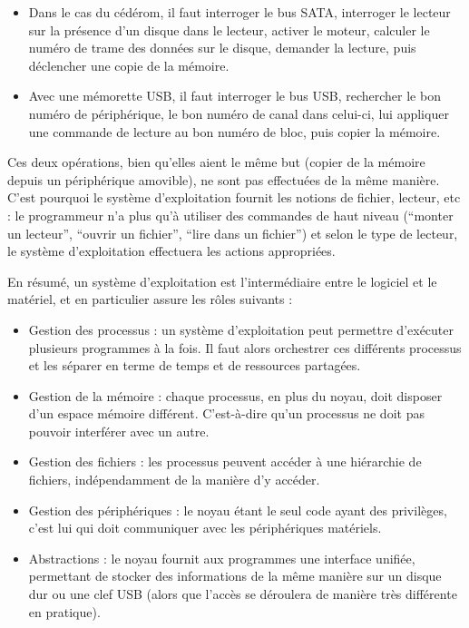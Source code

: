 \begin{itemize}

  \item Dans le cas du cédérom, il faut interroger le bus SATA, interroger le
    lecteur sur la présence d'un disque dans le lecteur, activer le moteur,
    calculer le numéro de trame des données sur le disque, demander la lecture,
    puis déclencher une
    copie de la mémoire.

  \item Avec une mémorette USB, il faut interroger le bus USB, rechercher le bon
    numéro de périphérique, le bon numéro de canal dans celui-ci, lui appliquer
    une commande de lecture au bon numéro de bloc, puis copier la mémoire.

\end{itemize}

Ces deux opérations, bien qu'elles aient le même but (copier de la mémoire
depuis un périphérique amovible), ne sont pas effectuées de la même manière.
C'est pourquoi le système d'exploitation fournit les notions de fichier,
lecteur, etc : le programmeur n'a plus qu'à utiliser des commandes de haut
niveau (``monter un lecteur'', ``ouvrir un fichier'', ``lire dans un fichier'')
et selon le type de lecteur, le système d'exploitation effectuera les actions
appropriées.

En résumé, un système d'exploitation est l'intermédiaire entre le logiciel et
le matériel, et en particulier assure les rôles suivants :


\begin{itemize}
\item
  Gestion des processus : un système d'exploitation peut permettre
  d'exécuter plusieurs programmes à la fois. Il faut alors orchestrer
  ces différents processus et les séparer en terme de temps et de
  ressources partagées.
\item
  Gestion de la mémoire : chaque processus, en plus du noyau, doit
  disposer d'un espace mémoire différent. C'est-à-dire qu'un processus
  ne doit pas pouvoir interférer avec un autre.
\item
  Gestion des fichiers : les processus peuvent accéder à une hiérarchie de
  fichiers, indépendamment de la manière d'y accéder.
\item
  Gestion des périphériques : le noyau étant le seul code ayant des privilèges,
  c'est lui qui doit communiquer avec les périphériques matériels.
\item
  Abstractions : le noyau fournit aux programmes une interface unifiée,
  permettant de stocker des informations de la même manière sur un
  disque dur ou une clef USB (alors que l'accès se déroulera de manière
  très différente en pratique).
\end{itemize}


